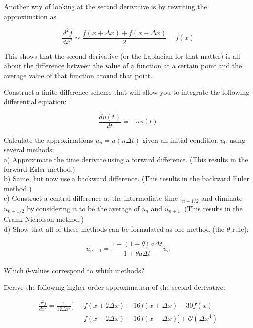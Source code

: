 Another way of looking at the second derivative is by rewriting the approximation as

\begin{equation}
\frac{d^2 f}{d x^2} \sim  \frac{f(x + \Delta x) + f(x - \Delta x)}{2} - f(x)
\end{equation}

\noindent{}This shows that the second derivative (or the Laplacian for that matter) is all about the difference between the value of a function at a certain point and the average value of that function around that point.

\begin{exer}
Construct a finite-difference scheme that will allow you to integrate the following differential equation:

$$\frac{du(t)}{dt} = -a u(t)$$

Calculate the approximations $u_n = u(n \Delta t)$ given an initial condition $u_0$ using several methods: \\

a) Approximate the time derivate using a forward difference. (This results in the forward Euler method.) \\

b) Same, but now use a backward difference. (This results in the backward Euler method.)\\

c) Construct a central difference at the intermediate time $t_{n+1/2}$ and eliminate $u_{n+1/2}$ by considering it to be the average of $u_{n}$ and $u_{n+1}$. (This results in the Crank-Nicholson method.) \\

d) Show that all of these methods can be formulated as one method (the $\theta$-rule):

$$u_{n+1} = \frac{1-(1-\theta) a \Delta t}{1+ \theta a \Delta t} u_n$$ \\

Which $\theta$-values correspond to which methods?

\end{exer}

\pagebreak

\begin{exer}
Derive the following higher-order approximation of the second derivative:

\begin{align}  
  \frac{d^2 f}{d x^2} = \frac{1}{12 \Delta x^2} \big[& -f(x + 2 \Delta x) + 16 f(x + \Delta x) -30 f(x) \nonumber \\
  &  - f(x - 2 \Delta x) + 16 f(x- \Delta x) \big] + \mathcal{O}\left(\Delta x^4\right)
\end{align} 
\end{exer}


